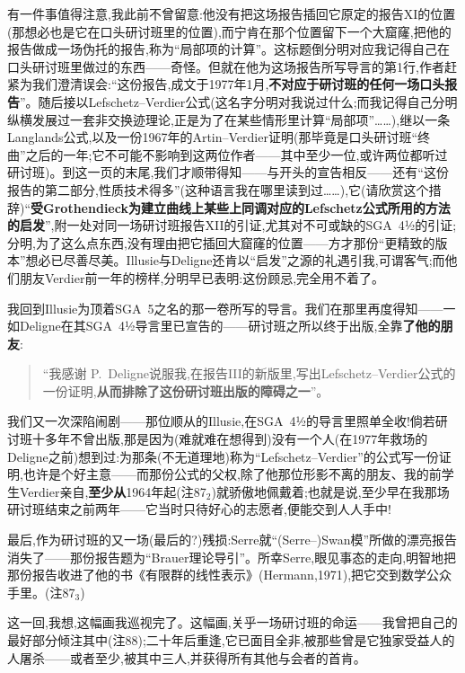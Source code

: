 有一件事值得注意,我此前不曾留意:他没有把这场报告插回它原定的报告XI的位置(那想必也是它在口头研讨班里的位置),而宁肯在那个位置留下一个大窟窿,把他的报告做成一场伪托的报告,称为“局部项的计算”。这标题倒分明对应我记得自己在口头研讨班里做过的东西——奇怪。但就在他为这场报告所写导言的第1行,作者赶紧为我们\dmark{}澄清误会:“这份报告,成文于1977年1月,\textbf{不对应于研讨班的任何一场口头报告}”。随后接以Lefschetz--Verdier公式(这名字分明对我说过什么;而我记得自己分明纵横发展过一套非交换迹理论,正是为了在某些情形里计算“局部项”……),继以一条Langlands公式,以及一份1967年的Artin--Verdier证明(那毕竟是口头研讨班“终曲”之后的一年;它不可能不影响到这两位作者——其中至少一位,或许两位都听过研讨班)。到这一页的末尾,我们才顺带得知——与开头的宣告相反——还有“这份报告的第二部分,性质技术得多”(这种语言我在哪里读到过……),它(请欣赏这个措辞)“\textbf{受Grothendieck为建立曲线上某些上同调对应的Lefschetz公式所用的方法的启发}”,附一处对同一场研讨班报告XII的引证,尤其对不可或缺的SGA~4½的引证;分明,为了这么点东西,没有理由把它插回大窟窿的位置——方才那份“更精致的版本”想必已尽善尽美。Illusie与Deligne还肯以“启发”之源的礼遇引我,可谓客气;而他们朋友Verdier前一年的榜样,分明早已表明:这份顾忌,完全用不着了。

我回到Illusie为顶着SGA~5之名的那一卷所写的导言。我们在那里再度得知——一如Deligne在其SGA~4½导言里已宣告的——研讨班之所以终于出版,全靠\textbf{了他的朋友}:

\begin{quote}
“我感谢 P.~Deligne说服我,在报告III的新版里,写出Lefschetz--Verdier公式的一份证明,\textbf{从而排除了这份研讨班出版的障碍之一}”。
\end{quote}

我们又一次深陷闹剧——那位顺从的Illusie,在SGA~4½的导言里照单全收!倘若研讨班十多年不曾出版,那是因为(难就难在想得到)没有一个人(在1977年救场的Deligne之前)想到过:为那条(不无道理地)称为“Lefschetz--Verdier”的公式写一份证明,也许是个好主意——而那份公式的父权,除了他那位\dmark{}形影不离的朋友、我的前学生Verdier亲自,\textbf{至少从}1964年起(注87$_{2}$)就骄傲地佩戴着;也就是说,至少早在我那场研讨班结束之前两年——它当时只待好心的志愿者,便能交到人人手中!

最后,作为研讨班的又一场(最后的?)残损:Serre就“(Serre--)Swan模”所做的漂亮报告消失了——那份报告题为“Brauer理论导引”。所幸Serre,眼见事态的走向,明智地把那份报告收进了他的书《有限群的线性表示》(Hermann,1971),把它交到数学公众手里。(注87$_{3}$)

这一回,我想,这幅画我巡视完了。这幅画,关乎一场研讨班的命运——我曾把自己的最好部分倾注其中(注88);二十年后重逢,它已面目全非,被那些曾是它独家受益人的人屠杀——或者至少,被其中三人,并获得所有其他与会者的首肯。

